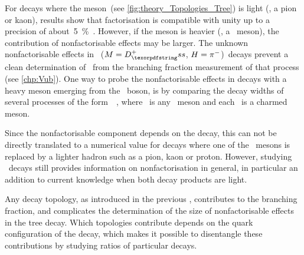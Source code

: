 For decays where the meson~\PM (see \cref{fig:theory_Topologies_Tree}) is light (\ie, a pion or kaon), results show that factorisation is compatible with unity up to a precision of about~\SI{5}{\percent}~\cite{Fleischer:2010ca}.
However, if the meson is heavier (\ie, a \DorDspm~meson), the contribution of nonfactorisable effects may be larger.
The unknown nonfactorisable effects in \ie \BdDsPi~(\({\PM = \Dsp}\), \({H = {{\pi}^-}}\))~decays prevent a clean determination of~\abs{\Vub} from the branching fraction measurement of that process (see \cref{chp:Vub}).
One way to probe the nonfactorisable effects in decays with a heavy meson emerging from the \Wpm~boson, is by comparing the decay widths of several processes of the form~\BDD~\cite{Bel:2015wha}, where \PB~is any \bquark~meson and each \PD~is a charmed meson.

Since the nonfactorisable component depends on the decay, this can not be directly translated to a numerical value for decays where one of the \DorDspm~mesons is replaced by a lighter hadron such as a pion, kaon or proton.
However, studying \BDD~decays still provides information on nonfactorisation in general, in particular an addition to current knowledge when both decay products are light.

Any decay topology, as introduced in the previous , contributes to the branching fraction, and complicates the determination of the size of nonfactorisable effects in the tree decay.
Which topologies contribute depends on the quark configuration of the decay, which makes it possible to disentangle these contributions by studying ratios of particular decays.

